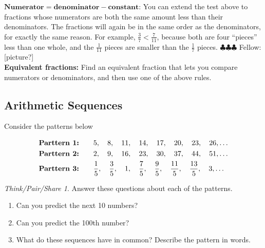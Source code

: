 \documentclass[10pt, reqno]{amsart}
\theoremstyle{remark}
\newtheorem*{thinkpair*}{Think/Pair/Share}
\theoremstyle{definition}
\numberwithin{equation}{section}  %
\newcommand{\fellow}[1]{{\color{magenta} \sf $\clubsuit\clubsuit\clubsuit$ Fellow: [#1]}}
\begin{document}
\noindent
$\textbf{Numerator} = \textbf{denominator} - \textbf{constant}$: You can extend the test above to fractions whose numerators are both the same amount less than their denominators. The fractions will again be in the same order as the denominators, for exactly the same reason.  For example, $\frac 3 7 < \frac 7{11}$, because both are  four ``pieces'' less than one whole, and the $\frac 1{11}$ pieces are smaller than the $\frac 17$ pieces. \fellow{picture?}  \\

\noindent
{\bf Equivalent fractions:} Find an equivalent fraction that lets you compare numerators or denominators, and then use one of the above rules. 





\subsection{Arithmetic Sequences}
Consider the patterns below

\begin{align*}
\text{\bf Parttern 1:} &\qquad5, \quad 8, \quad 11, \quad 14, \quad 17, \quad 20, \quad 23, \quad 26, \ldots\\
\text{\bf Parttern 2:} &\qquad2, \quad 9, \quad 16, \quad 23, \quad 30, \quad 37, \quad 44, \quad 51, \ldots\\
\text{\bf Parttern 3:} &\qquad\frac 1 5, \quad \frac 3 5 , \quad 1, \quad \frac 7 5, \quad \frac 9 5, \quad \frac {11}5, \quad \frac {13}5, \quad 3, \ldots
\end{align*}

\begin{thinkpair*}
Answer these questions about each of the patterns.
\begin{enumerate}
\item
Can you predict the next 10 numbers?  \\

\item
Can you predict the 100th number?\\

\item
What do  these sequences have in common?  Describe the pattern in words.
\end{enumerate}


\end{thinkpair*}
\end{document}
